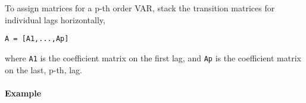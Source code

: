 To assign matrices for a p-th order VAR, stack the transition matrices
for individual lags horizontally,

\begin{verbatim}
A = [A1,...,Ap]
\end{verbatim}

where \texttt{A1} is the coefficient matrix on the first lag, and
\texttt{Ap} is the coefficient matrix on the last, p-th, lag.

\paragraph{Example}\label{example}



